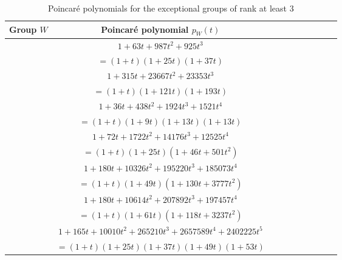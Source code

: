 \documentclass[11pt, reqno]{amsart}
\numberwithin{equation}{section}
\theoremstyle{definition}
\theoremstyle{plain}
\begin{document}
\begin{table}[h]
\caption{Poincar\'e polynomials for the exceptional groups of rank at least $3$}
\centering
\begin{tabular}{l c c rrrrrrr}
\hline \hline
Group $W$  &\multicolumn{1}{c}{Poincar\'e polynomial $p_W(t)$}
\\ [0.5ex]
\hline 
&$1+63t+987t^2+925t^3$ \\[-1ex]
\raisebox{1.5ex}{$W(Q)$} &   $=(1+t)(1+25t)(1+37t)$ \\[1ex]

&$1+315t+23667t^2+23353t^3$ \\[-1ex]
\raisebox{1.5ex}{$W(R)$} &   $=(1+t)(1+121t)(1+193t)$ \\[1ex]

&$1+36t+438t^2+1924t^3+1521t^4$ \\[-1ex]
\raisebox{1.5ex}{$W(S_1)$} &   $=(1+t)(1+9t)(1+13t)(1+13t)$ \\[1ex]

&$1+72t+1722t^2+14176t^3+12525t^4$ \\[-1ex]
\raisebox{1.5ex}{$W(S_2)$} &   $=(1+t)(1+25t)(1+46t+501t^2)$ \\[1ex]

&$1+180t+10326t^2+195220t^3+185073t^4$ \\[-1ex]
\raisebox{1.5ex}{$W(S_3)$} &   $=(1+t)(1+49t)(1+130t+3777t^2)$ \\[1ex]

&$1+180t+10614t^2+207892t^3+197457t^4$ \\[-1ex]
\raisebox{1.5ex}{$W(T)$} &   $=(1+t)(1+61t)(1+118t+3237t^2)$ \\[1ex]

& $1+165t+10010t^2+265210 t^3+2657589t^4+2402225t^5$ \\[-1ex]
\raisebox{1.5ex}{$W(U)$} &   $=(1+t)(1+25t)(1+37t)(1+49t)(1+53t)$ \\[1ex]

\hline 
\end{tabular}
\label{tab:PPer}
\end{table}
\end{document}
